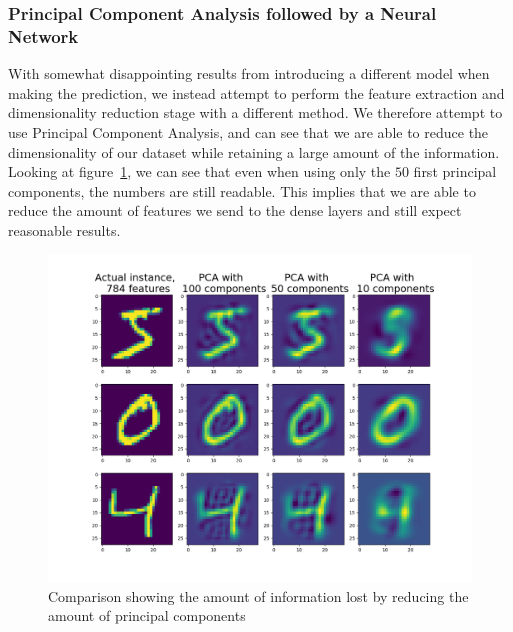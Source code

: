 \documentclass[onecolumn,10pt,cleanfoot]{asme2ej}
\begin{document}
\subsubsection{Principal Component Analysis followed by a Neural Network}

With somewhat disappointing results from introducing a different model when making the prediction, we instead attempt to perform the feature extraction and dimensionality reduction stage with a different method. We therefore attempt to use Principal Component Analysis, and can see that we are able to reduce the dimensionality of our dataset while retaining a large amount of the information. Looking at figure~\ref{pcacomp}, we can see that even when using only the $50$ first principal components, the numbers are still readable. This implies that we are able to reduce the amount of features we send to the dense layers and still expect reasonable results.

\begin{figure}[H]
\centerline{\includegraphics[width=5in]{figure/pcacomp.png}}
\caption{Comparison showing the amount of information lost by reducing the amount of principal components}
\label{pcacomp}
\end{figure}
\end{document}
